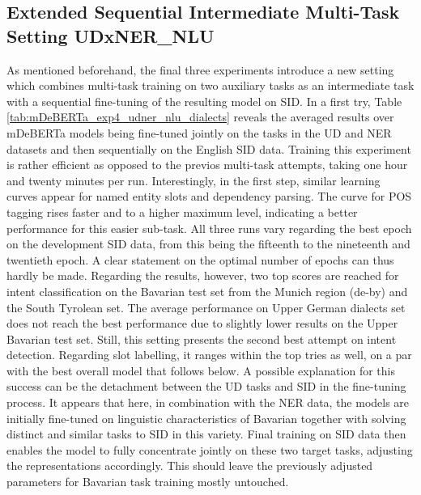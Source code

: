 \documentclass[11pt,a4paper,twoside,openright]{scrbook}
\begin{document}
\subsection{Extended Sequential Intermediate Multi-Task Setting UDxNER\_NLU}

As mentioned beforehand, the final three experiments introduce a new setting which combines multi-task training on two auxiliary tasks as an intermediate task with a sequential fine-tuning of the resulting model on SID. In a first try, Table \ref{tab:mDeBERTa_exp4_udner_nlu_dialects} reveals the averaged results over mDeBERTa models being fine-tuned jointly on the tasks in the UD and NER datasets and then sequentially on the English SID data. Training this experiment is rather efficient as opposed to the previos multi-task attempts, taking one hour and twenty minutes per run. Interestingly, in the first step, similar learning curves appear for named entity slots and dependency parsing. The curve for POS tagging rises faster and to a higher maximum level, indicating a better performance for this easier sub-task. All three runs vary regarding the best epoch on the development SID data, from this being the fifteenth to the nineteenth and twentieth epoch. A clear statement on the optimal number of epochs can thus hardly be made. Regarding the results, however, two top scores are reached for intent classification on the Bavarian test set from the Munich region (de-by) and the South Tyrolean set. The average performance on Upper German dialects set does not reach the best performance due to slightly lower results on the Upper Bavarian test set. Still, this setting presents the second best attempt on intent detection. Regarding slot labelling, it ranges within the top tries as well, on a par with the best overall model that follows below. A possible explanation for this success can be the detachment between the UD tasks and SID in the fine-tuning process. It appears that here, in combination with the NER data, the models are initially fine-tuned on linguistic characteristics of Bavarian together with solving distinct and similar tasks to SID in this variety. Final training on SID data then enables the model to fully concentrate jointly on these two target tasks, adjusting the representations accordingly. This should leave the previously adjusted parameters for Bavarian task training mostly untouched.
\end{document}
